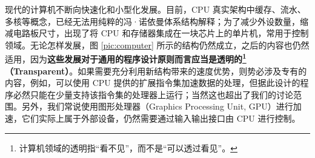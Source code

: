 现代的计算机不断向快速化和小型化发展。目前，CPU 真实架构中缓存、流水、多核等概念，已经无法用纯粹的冯·诺依曼体系结构解释；为了减少外设数量，缩减电路板尺寸，出现了将 CPU 和存储器集成在一块芯片上的单片机，常用于控制领域。无论怎样发展，图 \ref{pic:computer} 所示的结构仍然成立，之后的内容也仍然适用，因为\textbf{这些发展对于通用的程序设计原则而言应当是透明的\footnote{计算机领域的透明指“看不见”，而不是“可以透过看见”。}（Transparent）}。如果需要充分利用新结构带来的速度优势，则势必涉及专有的内容，例如，可以使用 CPU 提供的扩展指令集加速数据的处理，但据此设计的程序必然只能在少量支持该指令集的处理器上运行；当然这也超出了我们的讨论范围。另外，我们常说使用图形处理器（Graphics Processing Unit, GPU）进行加速，它们实际上属于外部设备，仍然需要通过输入输出接口由 CPU 进行控制。

\clearpage